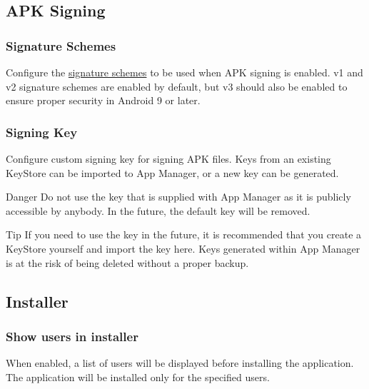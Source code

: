 \subsection{APK Signing}\label{subsec:apk-signing} %

\subsubsection{Signature Schemes} %
Configure the \href{https://source.android.com/security/apksigning}{signature schemes} to be used when APK signing is enabled.
v1 and v2 signature schemes are enabled by default, but v3 should also be enabled to ensure proper security in Android 9 or later.

\subsubsection{Signing Key} %
Configure custom signing key for signing APK files. Keys from an existing KeyStore can be imported to App Manager,
or a new key can be generated.

\begin{danger}{Danger}
    Do not use the key that is supplied with App Manager as it is publicly accessible by anybody. In the future,
    the default key will be removed.
\end{danger}

\begin{tip}{Tip}
    If you need to use the key in the future, it is recommended that you create a KeyStore yourself and import the key
    here. Keys generated within App Manager is at the risk of being deleted without a proper backup.
\end{tip}

\subsection{Installer}\label{subsec:installer} %

\subsubsection{Show users in installer} %
When enabled, a list of users will be displayed before installing the application. The application will be installed
only for the specified users.

